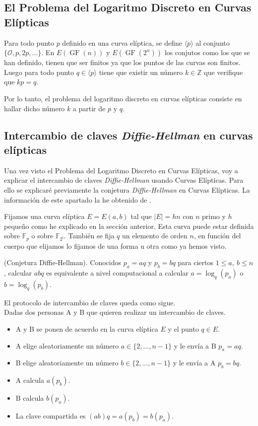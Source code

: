 \subsection{El Problema del Logaritmo Discreto en Curvas Elípticas}
Para todo punto $p$ definido en una curva elíptica, se define $\langle p\rangle$ al conjunto $\{\mathcal{O}, p, 2p, ... \}$.
En $E(\operatorname{GF}(n))$ y $E(\operatorname{GF}(2^n))$ los conjutos como los que se han definido, tienen que ser finitos ya que los puntos de las curvas son finitos. Luego para todo punto $q\in \langle p\rangle$ tiene que existir un número $k \in \mathbb{Z}$ que verifique que $kp=q$.

Por lo tanto, el problema del logaritmo discreto en curvas elípticas consiste en hallar dicho número $k$ a partir de $p$ y $q$.
\subsection{Intercambio de claves \emph{Diffie-Hellman} en curvas elípticas}
Una vez visto el Problema del Logaritmo Discreto en Curvas Elípticas, voy a explicar el intercambio de claves \emph{Diffie-Hellman} usando Curvas Elípticas. Para ello se explicaré previamente la conjetura \emph{Diffie-Hellman} en Curvas Elípticas. La información de este apartado la he obtenido de \cite{apuntesCriptografia}.

Fijamos una curva elíptica $E=E(a,b)$ tal que $|E|=hn$ con $n$ primo y $h$ pequeño como he explicado en la sección anterior. Esta curva puede estar definida sobre $\mathbb{F}_p$ o sobre $\mathbb{F}_{2^l}$. También se fija  $q$ un elemento de orden $n$, en función del cuerpo que elijamos lo fijamos de una forma u otra como ya hemos visto.
\begin{definicion}
	(Conjetura Diffie-Hellman). Conocidos $p_a=aq$ y $p_b=bq$ para ciertos $1\leq a,\: b\leq n$, calcular $abq$ es equivalente a nivel computacional a calcular $a=\log_q(p_a)$ o $b=\log_q(p_b)$.
\end{definicion}
El protocolo de intercambio de claves queda como sigue.\\
Dadas dos personas A y B que quieren realizar un intercambio de claves.
\begin{itemize}
	\item A y B se ponen de acuerdo en la curva elíptica $E$ y el punto $q\in E$.
	\item A elige aleatoriamente un número $a\in\{2,\dots,n-1\}$ y le envía a B $p_a=aq$.
	\item B elige aleatoriamente un número $b\in\{2,\dots,n-1\}$ y le envía a A $p_b=bq$.
	\item A calcula $a(p_b)$.
	\item B calcula $b(p_a)$.
	\item La clave compartida es $(ab)q=a(p_b)=b(p_a)$.
\end{itemize}

